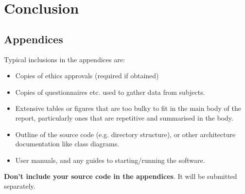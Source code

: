 \documentclass{l4proj}
\begin{document}
\chapter{Conclusion}    

\begin{appendices}

\chapter{Appendices}

Typical inclusions in the appendices are:

\begin{itemize}
\item
  Copies of ethics approvals (required if obtained)
\item
  Copies of questionnaires etc. used to gather data from subjects.
\item
  Extensive tables or figures that are too bulky to fit in the main body of
  the report, particularly ones that are repetitive and summarised in the body.

\item Outline of the source code (e.g. directory structure), or other architecture documentation like class diagrams.

\item User manuals, and any guides to starting/running the software.

\end{itemize}

\textbf{Don't include your source code in the appendices}. It will be
submitted separately.

\end{appendices}






\end{document}
